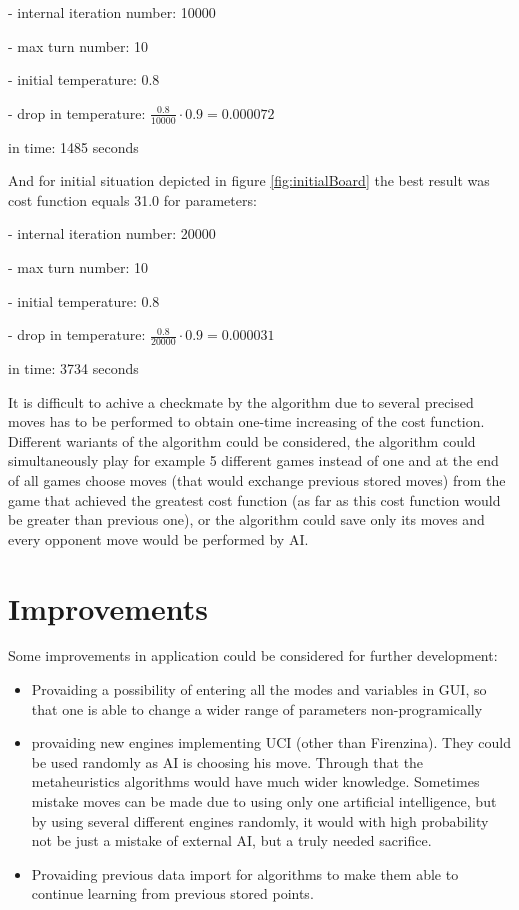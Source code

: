 \documentclass[pdftex]{article}
\begin{document}
- internal iteration number: 10000

- max turn number: 10

- initial temperature: 0.8

- drop in temperature: $\frac{0.8}{10000} \cdot 0.9 = 0.000072$

in time: 1485 seconds

And for initial situation depicted in figure \ref{fig:initialBoard} the best result was cost function equals 31.0 for parameters:

- internal iteration number: 20000

- max turn number: 10

- initial temperature: 0.8

- drop in temperature: $\frac{0.8}{20000} \cdot 0.9 = 0.000031$

in time: 3734 seconds

It is difficult to achive a checkmate by the algorithm due to several precised moves has to be performed to obtain one-time increasing of the cost function. Different wariants of the algorithm could be considered, the algorithm could simultaneously play for example 5 different games instead of one and at the end of all games choose moves (that would exchange previous stored moves) from the game that achieved the greatest cost function (as far as this cost function would be greater than previous one), or the algorithm could save only its moves and every opponent move would be performed by AI.

\section{Improvements}
\label{sec:improvements}

Some improvements in application could be considered for further development:
\begin{itemize}
 	\item Provaiding a possibility of entering all the modes and variables in GUI, so that one is able to change a wider range of parameters non-programically 
 	\item provaiding new engines implementing UCI (other than Firenzina). They could be used randomly as AI is choosing his move. Through that the metaheuristics algorithms would have much wider knowledge. Sometimes mistake moves can be made due to using only one artificial intelligence, but by using several different engines randomly, it would with high probability not be just a mistake of external AI, but a truly needed sacrifice.
 	\item Provaiding previous data import for algorithms to make them able to continue learning from previous stored points.
\end{itemize}
\end{document}
